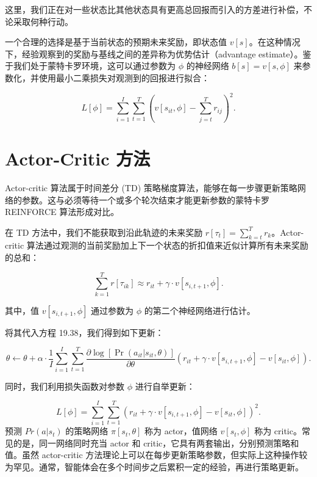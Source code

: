 \documentclass[lang=cn,newtx,10pt,scheme=chinese]{elegantbook}
\begin{document}
这里，我们正在对一些状态比其他状态具有更高总回报而引入的方差进行补偿，不论采取何种行动。

一个合理的选择是基于当前状态的预期未来奖励，即状态值 \(v[s]\)。在这种情况下，经验观察到的奖励与基线之间的差异称为优势估计（advantage estimate）。鉴于我们处于蒙特卡罗环境，这可以通过参数为 \(\phi\) 的神经网络 \(b[s] = v[s, \phi]\) 来参数化，并使用最小二乘损失对观测到的回报进行拟合：

\begin{equation}
L[\phi] = \sum_{i=1}^{I} \sum_{t=1}^{T} \left( v[s_{it}, \phi] - \sum_{j=t}^{T} r_{ij} \right)^2. 
\end{equation}

\section{Actor-Critic 方法}
Actor-critic 算法属于时间差分 (TD) 策略梯度算法，能够在每一步骤更新策略网络的参数。这与必须等待一个或多个轮次结束才能更新参数的蒙特卡罗 REINFORCE 算法形成对比。

在 TD 方法中，我们不能获取到沿此轨迹的未来奖励 \(r[\tau_t] = \sum_{k=t}^T r_k\)。Actor-critic 算法通过观测的当前奖励加上下一个状态的折扣值来近似计算所有未来奖励的总和：

\begin{equation}
\sum_{k=1}^{T} r[\tau_{ik}] \approx r_{it} + \gamma \cdot v[s_{i,t+1}, \phi]. 
\end{equation}

其中，值 \(v[s_{i,t+1}, \phi]\) 通过参数为 \(\phi\) 的第二个神经网络进行估计。

将其代入方程 19.38，我们得到如下更新：

\begin{equation}
\theta \leftarrow \theta + \alpha \cdot \frac{1}{I} \sum_{i=1}^{I} \sum_{t=1}^{T} \frac{\partial \log[\Pr(a_{it}|s_{it}, \theta)]}{\partial \theta} (r_{it} + \gamma \cdot v[s_{i,t+1}, \phi] - v[s_{it}, \phi]). 
\end{equation}

同时，我们利用损失函数对参数 \(\phi\) 进行自举更新：

\begin{equation}
L[\phi] = \sum_{i=1}^{I} \sum_{t=1}^{T} \left( r_{it} + \gamma \cdot v[s_{i,t+1}, \phi] - v[s_{it}, \phi] \right)^2. 
\end{equation}
预测 \(Pr(a|s_t)\) 的策略网络 \(\pi[s_t,\theta]\) 称为 actor，值网络 \(v[s_t,\phi]\) 称为 critic。常见的是，同一网络同时充当 actor 和 critic，它具有两套输出，分别预测策略和值。虽然 actor-critic 方法理论上可以在每步更新策略参数，但实际上这种操作较为罕见。通常，智能体会在多个时间步之后累积一定的经验，再进行策略更新。
\end{document}
